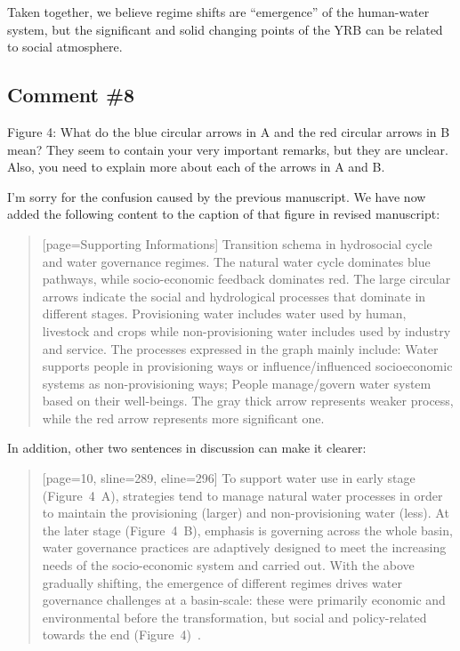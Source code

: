 \AR*{} Taken together, we believe regime shifts are ``emergence'' of the human-water system, but the significant and solid changing points of the YRB can be related to social atmosphere.

\subsection{Comment \#8}
\RC{} Figure 4: What do the blue circular arrows in A and the red circular arrows in B mean? They seem to contain your very important remarks, but they are unclear. Also, you need to explain more about each of the arrows in A and B.

\AR{} I'm sorry for the confusion caused by the previous manuscript. We have now added the following content to the caption of that figure in revised manuscript:

\begin{quote}[page=Supporting Informations]
    Transition schema in hydrosocial cycle and water governance regimes. The natural water cycle dominates blue pathways, while socio-economic feedback dominates red.
    The large circular arrows indicate the social and hydrological processes that dominate in different stages.
    Provisioning water includes water used by human, livestock and crops while non-provisioning water includes used by industry and service.
    The processes expressed in the graph mainly include: Water supports people in provisioning ways or influence/influenced socioeconomic systems as non-provisioning ways; People manage/govern water system based on their well-beings.
    The gray thick arrow represents weaker process, while the red arrow represents more significant one.
\end{quote}

\AR*{} In addition, other two sentences in discussion can make it clearer:

\begin{quote}[page=10, sline=289, eline=296]
    To support water use in early stage (Figure~4~A), strategies tend to manage natural water processes in order to maintain the provisioning (larger) and non-provisioning water (less).
    At the later stage (Figure~4~B), emphasis is governing across the whole basin, water governance practices are adaptively designed to meet the increasing needs of the socio-economic system and carried out.
    With the above gradually shifting, the emergence of different regimes drives water governance challenges at a basin-scale: these were primarily economic and environmental before the transformation, but social and policy-related towards the end (Figure~4)~\cite{singh2019,porcher2019}.
\end{quote}

